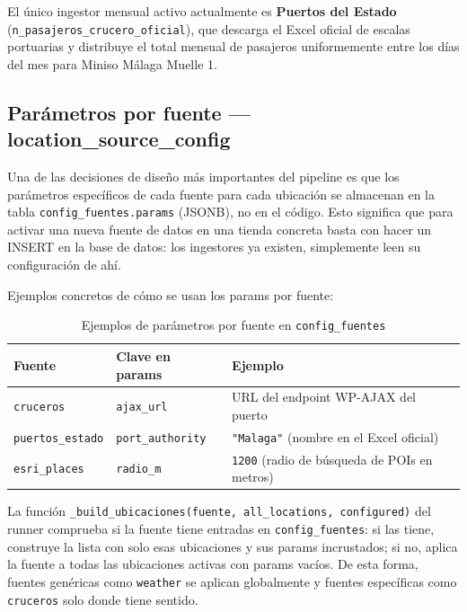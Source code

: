 \documentclass[12pt, a4paper]{article}
\begin{document}
El único ingestor mensual activo actualmente es \textbf{Puertos del Estado} (\texttt{n\_pasajeros\_crucero\_oficial}), que descarga el Excel oficial de escalas portuarias y distribuye el total mensual de pasajeros uniformemente entre los días del mes para Miniso Málaga Muelle 1.

\subsection{Parámetros por fuente — location\_source\_config}

Una de las decisiones de diseño más importantes del pipeline es que los parámetros específicos de cada fuente para cada ubicación se almacenan en la tabla \texttt{config\_fuentes.params} (JSONB), no en el código. Esto significa que para activar una nueva fuente de datos en una tienda concreta basta con hacer un INSERT en la base de datos: los ingestores ya existen, simplemente leen su configuración de ahí.

Ejemplos concretos de cómo se usan los params por fuente:

\begin{table}[H]
\centering
\renewcommand{\arraystretch}{1.3}
\begin{tabular}{llp{6cm}}
\toprule
\textbf{Fuente} & \textbf{Clave en params} & \textbf{Ejemplo} \\
\midrule
\texttt{cruceros}      & \texttt{ajax\_url}       & URL del endpoint WP-AJAX del puerto \\
\texttt{puertos\_estado} & \texttt{port\_authority} & \texttt{"Malaga"} (nombre en el Excel oficial) \\
\texttt{esri\_places}  & \texttt{radio\_m}        & \texttt{1200} (radio de búsqueda de POIs en metros) \\
\bottomrule
\end{tabular}
\caption{Ejemplos de parámetros por fuente en \texttt{config\_fuentes}}
\end{table}

La función \texttt{\_build\_ubicaciones(fuente, all\_locations, configured)} del runner comprueba si la fuente tiene entradas en \texttt{config\_fuentes}: si las tiene, construye la lista con solo esas ubicaciones y sus params incrustados; si no, aplica la fuente a todas las ubicaciones activas con params vacíos. De esta forma, fuentes genéricas como \texttt{weather} se aplican globalmente y fuentes específicas como \texttt{cruceros} solo donde tiene sentido.

\end{document}
